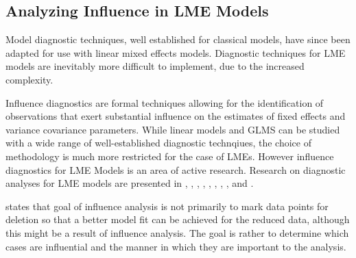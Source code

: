 \documentclass[12pt, a4paper]{report}
\theoremstyle{plain}
\theoremstyle{definition}
\theoremstyle{remark}
\begin{document}
	
	
	
	

	
\newpage
\subsection{Analyzing Influence in LME Models}

Model diagnostic techniques, well established for classical models, have since been adapted for use with linear mixed effects models. Diagnostic techniques for LME models are inevitably more difficult to implement, due to the increased complexity.

Influence diagnostics are formal techniques allowing for the identification of observations that exert substantial  influence on the estimates of fixed effects and variance covariance parameters.
While linear models and GLMS can be studied with a wide range of well-established diagnostic technqiues, the choice of methodology is much more restricted for the case of LMEs. However
influence diagnostics for LME Models is an area of active research. Research on diagnostic analyses for LME models are presented in \citet{Beckman}, 
\citet{Christensen}, \citet{HildenMinton}, \citet{lesaffre1998local}, \citet{Banerjee1997}, 
\citet{fung2002}, \citet{Demi}, \citet{Zewotir}, \citet{zewotir2008} and \citet{NobreSinger2007, NobreSinger2011}.





\citet{schabenberger} states that goal of influence analysis is not primarily to mark data
points for deletion so that a better model fit can be achieved for the reduced data, although this might be a
result of influence analysis. The goal is rather to determine which cases are influential and the manner in
which they are important to the analysis. 



\end{document}
